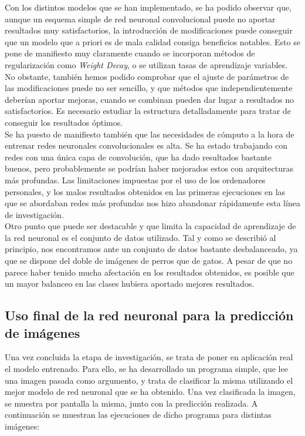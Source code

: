 \documentclass[11pt]{article}
\theoremstyle{plain}
\theoremstyle{definition}
\begin{document}
Con los distintos modelos que se han implementado, se ha podido
observar que, aunque un esquema simple de red neuronal convolucional
puede no aportar resultados muy satisfactorios, la introducción de
modificaciones puede conseguir que un modelo que a priori es de mala
calidad consiga beneficios notables. Esto se pone de manifiesto muy
claramente cuando se incorporan métodos de regularización como
\textit{Weight Decay}, o se utilizan tasas de aprendizaje variables.
No obstante, también hemos podido comprobar que el ajuste de
parámetros de las modificaciones puede no ser sencillo, y que métodos
que independientemente deberían aportar mejoras, cuando se combinan
pueden dar lugar a resultados no satisfactorios. Es necesario estudiar
la estructura detalladamente para tratar de conseguir los resultados
óptimos.\\

Se ha puesto de manifiesto también que las necesidades de cómputo a la
hora de entrenar redes neuronales convolucionales es alta. Se ha
estado trabajando con redes con una única capa de convolución, que ha
dado resultados bastante buenos, pero probablemente se podrían haber
mejorados estos con arquitecturas más profundas. Las limitaciones
impuestas por el uso de los ordenadores personales, y los malos
resultados obtenidos en las primeras ejecuciones en las que se
abordaban redes más profundas nos hizo abandonar rápidamente esta
línea de investigación.\\

Otro punto que puede ser destacable y que limita la capacidad de
aprendizaje de la red neuronal es el conjunto de datos utilizado. Tal
y como se describió al principio, nos encontramos ante un conjunto de
datos bastante desbalanceado, ya que se dispone del doble de imágenes
de perros que de gatos. A pesar de que no parece haber tenido mucha
afectación en los resultados obtenidos, es posible que un mayor balanceo
en las clases hubiera aportado mejores resultados.\\

\subsection{Uso final de la red neuronal para la predicción de imágenes}

Una vez concluida la etapa de investigación, se trata de poner en
aplicación real el modelo entrenado. Para ello, se ha desarrollado
un programa simple, que lee una imagen pasada como argumento, y trata
de clasificar la misma utilizando el mejor modelo de red neuronal que
se ha obtenido. Una vez clasificada la imagen, se muestra por pantalla
la misma, junto con la predicción realizada. A continuación se muestran
las ejecuciones de dicho programa para distintas imágenes:
\end{document}
